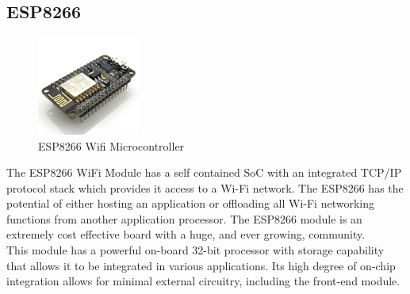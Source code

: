     \subsection{ESP8266}
        \begin{figure}
        	\includegraphics[width=0.3\textwidth]{photos/theory/esp8266.jpg}
        	\caption{ESP8266 Wifi Microcontroller}
        \end{figure}
    
        The ESP8266 WiFi Module has a self contained SoC with an integrated TCP/IP protocol stack which provides it access to a Wi-Fi network. The ESP8266 has the potential of either hosting an application or offloading all Wi-Fi networking functions from another application processor. The ESP8266 module is an extremely cost effective board with a huge, and ever growing, community.\\
        This module has a powerful on-board 32-bit processor with storage capability that allows it to be integrated in various applications. Its high degree of on-chip integration allows for minimal external circuitry, including the front-end module.\\
        
